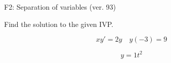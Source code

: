 \begin{exercise}
  \begin{exerciseTitle}F2: Separation of variables (ver. 93)\end{exerciseTitle}
  \begin{exerciseStatement}
    
Find the solution to the given IVP.

    
\[xy'= 2 y \hspace{1em} y( -3 ) = 9\]

  \end{exerciseStatement}
  \begin{exerciseAnswer}
    
\[y= 1 t^ 2\]

  \end{exerciseAnswer}
\end{exercise}